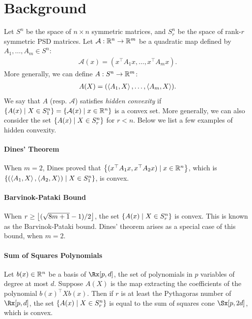 \documentclass[11pt]{article}
\newcommand{\cA}{\mathcal{A}}
\begin{document}
\section{Background}
Let $S^n$ be the space of $n\times n$ symmetric matrices, and $S^n_r$ be the
space of rank-$r$ symmetric PSD matrices.  Let $\cA: \R^n \rightarrow \R^m$ be a
quadratic map defined by $A_1, \ldots, A_m \in S^n$:
\begin{align*}
  \cA(x) = (x^\top A_1 x, \ldots, x^\top A_m x).
\end{align*}
More generally, we can define
$A: S^n \rightarrow \mathbb{R}^m$:
\begin{align*}
  A(X) = (\left\langle A_1, X \right\rangle, \ldots, \left\langle A_m, X \right\rangle).
\end{align*}
We say that $A$ (resp. $\cA$) satisfies \emph{hidden convexity} if
$\braces{A(x) \mid X \in S_1^n} = \braces{\cA(x) \mid x \in \R^n}$ is a convex
set. More generally, we can also consider the set
$\left\{ A(x) \mid X \in S_r^n \right\}$ for $r < n$. Below we list a few examples of
hidden convexity.

\paragraph{Dines' Theorem} When $m=2$, Dines \cite{dines1941mapping} proved that
$\left\{ (x^\top A_1 x, x^\top A_2 x) \mid x \in \mathbb{R}^n \right\}$, which is
$ \left\{ (\left\langle A_1, X \right\rangle, \left\langle A_2, X \right\rangle) \mid X \in S_1^n \right\}$, is convex.

\paragraph{Barvinok-Pataki Bound} When $r \ge \left\lfloor (\sqrt{8m+1}-1)/2 \right\rfloor$, the
set $\left\{ A(x) \mid X \in S_r^n \right\}$ is convex. This is known as the
Barvinok-Pataki
\cite{BarvinokFeasibilitytestingsystems1993,PatakiRankExtremeMatrices1998}
bound. Dines' theorem arises as a special case of this bound, when $m = 2$.

\paragraph{Sum of Squares Polynomials} Let $b(x) \in \mathbb{R}^n$ be a basis of
$\Rx[p, d]$, the set of polynomials in $p$ variables of degree at most
$d$. Suppose $A(X)$ is the map extracting the coefficients of the polynomial
$b(x)^\top X b(x)$. Then if $r$ is at least the Pythagoras number of
$\Rx[p, d]$, the set $\left\{ A(x) \mid X \in S_r^n \right\}$ is equal to the sum of
squares cone $\Sx[p, 2d]$, which is convex.
\end{document}
